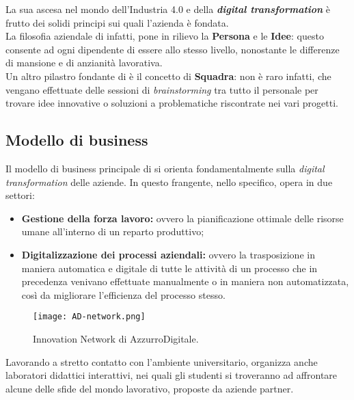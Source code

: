 La sua ascesa nel mondo dell'Industria 4.0 e della \textbf{\textit{digital transformation}} è frutto dei solidi principi sui quali l'azienda è fondata.\\
La filosofia aziendale di \AD{} infatti, pone in rilievo la \textbf{Persona} e le \textbf{Idee}: questo consente ad ogni dipendente di essere allo stesso livello, nonostante le differenze di mansione e di anzianità lavorativa.\\
Un altro pilastro fondante di \AD{} è il concetto di \textbf{Squadra}: non è raro infatti, che vengano effettuate delle sessioni di \textit{brainstorming} tra tutto il personale per trovare idee innovative o soluzioni a problematiche riscontrate nei vari progetti.\\


\subsection{Modello di business}
Il modello di business principale di \AD{} si orienta fondamentalmente sulla \textit{digital transformation} delle aziende.
In questo frangente, nello specifico, \AD{} opera in due settori:
\begin{itemize}
\item \textbf{Gestione della forza lavoro:} ovvero la pianificazione ottimale delle risorse umane all'interno di un reparto produttivo;
\item \textbf{Digitalizzazione dei processi aziendali:} ovvero la trasposizione in maniera automatica e digitale di tutte le attività di un processo che in precedenza venivano effettuate manualmente o in maniera non automatizzata, così da migliorare l'efficienza del processo stesso. 
\end{itemize}
\begin{figure}[h]
\texttt{[image: AD-network.png]}
\centering
\caption{Innovation Network di AzzurroDigitale.} 
\label{fig:innovation-network}
\end{figure}
Lavorando a stretto contatto con l'ambiente universitario, \AD{} organizza anche laboratori didattici interattivi, nei quali gli studenti si troveranno ad affrontare alcune delle sfide del mondo lavorativo, proposte da aziende partner.

